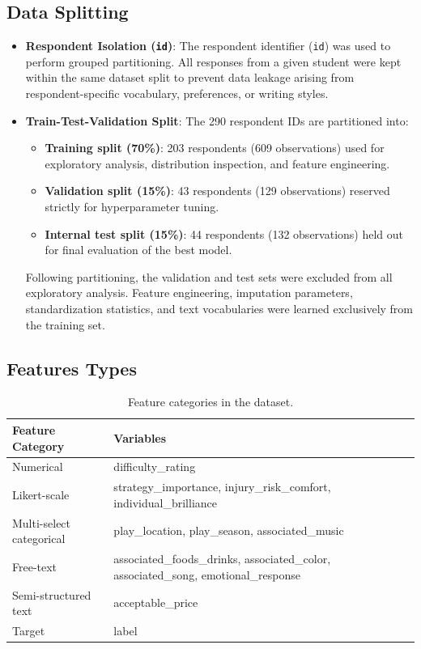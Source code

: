 \documentclass[12pt]{article}
\begin{document}
\subsection*{Data Splitting}
\begin{itemize}[leftmargin=1.5em]
    \item \textbf{Respondent Isolation (\texttt{id})}: The respondent identifier (\texttt{id}) was used to perform grouped partitioning. All responses from a given student were kept within the same dataset split to prevent data leakage arising from respondent-specific vocabulary, preferences, or writing styles.
    \item \textbf{Train-Test-Validation Split}: The 290 respondent IDs are partitioned into:
    \begin{itemize}
        \item \textbf{Training split (70\%)}: 203 respondents (609 observations) used for exploratory analysis, distribution inspection, and feature engineering.
        \item \textbf{Validation split (15\%)}: 43 respondents (129 observations) reserved strictly for hyperparameter tuning.
        \item \textbf{Internal test split (15\%)}: 44 respondents (132 observations) held out for final evaluation of the best model.
    \end{itemize}

    Following partitioning, the validation and test sets were excluded from all exploratory analysis. Feature engineering, imputation parameters, standardization statistics, and text vocabularies were learned exclusively from the training set.
\end{itemize}

\subsection*{Features Types}
\begin{table}[H] \centering \caption{Feature categories in the dataset.} \label{tab:feature_types} \footnotesize \begin{tabular}{p{3cm} p{13cm}} \toprule \textbf{Feature Category} & \textbf{Variables} \\ \midrule Numerical & difficulty\_rating \\ Likert-scale & strategy\_importance, injury\_risk\_comfort, individual\_brilliance \\ Multi-select categorical & play\_location, play\_season, associated\_music \\ Free-text & associated\_foods\_drinks, associated\_color, associated\_song, emotional\_response \\ Semi-structured text & acceptable\_price \\ Target & label \\ \bottomrule \end{tabular} \end{table}
\end{document}
